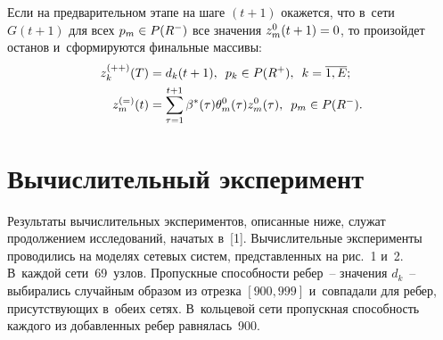 \begin{multicols}{2}
Если на предварительном этапе на шаге $(t+1)$ окажется, что в~сети~$G(t+1)$ для всех $p_m\hm\in P(R^-)$ все значения
$z_m^0(t+1)\hm=0$, то произойдет останов и~сформируются финальные
массивы:
\begin{align*}
z_k^{(++)}(T)&=d_k(t+1), \enskip
p_k\in P(R^+), \enskip k=\overline{1,E};
\\
z_m^{(=)}(t)&=\sum\limits_{\tau=1}^{t+1}\beta^*(\tau)
\theta_m^0(\tau) z_m^0(\tau), \enskip p_m\in P(R^-).
\end{align*}



\section{Вычислительный эксперимент}

Результаты вычислительных экспериментов, описанные ниже, служат
продолжением исследований, начатых в~[1]. Вычислительные
эксперименты проводились на моделях сетевых сис\-тем, пред\-став\-лен\-ных
на рис.~1 и~2. В~каждой сети~69~узлов. Пропускные спо\-соб\-но\-сти
ребер~-- значения $d_k$~-- выбирались случайным образом из отрезка
$[900,999]$ и~совпадали для ребер, при\-сут\-ст\-ву\-ющих в~обеих сетях.
В~кольцевой сети пропускная спо\-соб\-ность каждого из добавленных
ребер равнялась~900.

\begin{figure*} %
\vspace*{1pt}
\begin{minipage}[t]{80mm}
  \begin{center}  
    \mbox{%
\epsfxsize=69.408mm
}

\end{center}
\vspace*{-6pt}
\end{minipage}
\hfill
\vspace*{1pt}
\begin{minipage}[t]{80mm}
  \begin{center}  
    \mbox{%
\epsfxsize=69.408mm
}

\end{center}
\vspace*{-6pt}
\end{minipage}
\end{figure*}

\begin{table*}[b]\small %
\vspace*{-12pt}
\begin{center}


\end{center}
\end{table*}
\end{multicols}

